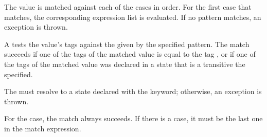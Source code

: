 \begin{quote}


 {}  

 {} 


 {}





 {} 

\end{quote}

The value is matched against each of the cases in order.  For the
first case that matches, the corresponding expression list is
evaluated.  If no pattern matches, an exception is
thrown.

A  tests the value's tags against
the  given by the specified pattern.  The match succeeds if
one of the tags of the matched value is equal to the tag
, or if one of the tags of the matched value
was declared in a state that is a transitive  the
 specified.

The 
must resolve to a state declared with the 
keyword; otherwise, an exception is
thrown. 

For the  case, the match always succeeds.  If
there is a  case, it must be the last one in the match
expression.



\begin{quote}


 {}

 {}

 {}  



 {} \alt {}



 {} 

\end{quote}

